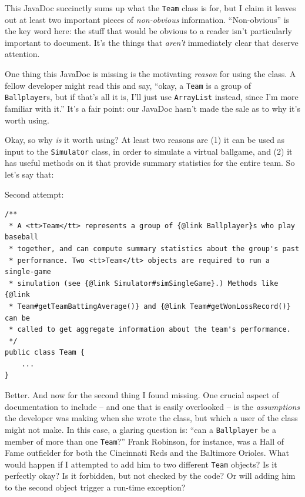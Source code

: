 This JavaDoc succinctly sums up what the \texttt{Team} class is for, but I
claim it leaves out at least two important pieces of \textit{non-obvious}
information. ``Non-obvious'' is the key word here: the stuff that would be
obvious to a reader isn't particularly important to document. It's the things
that \textit{aren't} immediately clear that deserve attention.

One thing this JavaDoc is missing is the motivating \textit{reason} for using
the class. A fellow developer might read this and say, ``okay, a \texttt{Team}
is a group of \texttt{Ballplayer}s, but if that's all it is, I'll just use
\texttt{ArrayList} instead, since I'm more familiar with it.'' It's a fair
point: our JavaDoc hasn't made the sale as to why it's worth using.

Okay, so why \textit{is} it worth using? At least two reasons are (1) it can
be used as input to the \texttt{Simulator} class, in order to simulate a
virtual ballgame, and (2) it has useful methods on it that provide summary
statistics for the entire team. So let's say that:

Second attempt:
\vspace{-.15in}
\begin{Verbatim}[fontsize=\footnotesize,samepage=true,frame=single]
/**
 * A <tt>Team</tt> represents a group of {@link Ballplayer}s who play baseball
 * together, and can compute summary statistics about the group's past
 * performance. Two <tt>Team</tt> objects are required to run a single-game
 * simulation (see {@link Simulator#simSingleGame}.) Methods like {@link 
 * Team#getTeamBattingAverage()} and {@link Team#getWonLossRecord()} can be 
 * called to get aggregate information about the team's performance.
 */
public class Team {
    ...
}
\end{Verbatim}

Better. And now for the second thing I found missing. One crucial aspect of
documentation to include -- and one that is easily overlooked -- is the
\textit{assumptions} the developer was making when she wrote the class, but
which a user of the class might not make. In this case, a glaring question is:
``can a \texttt{Ballplayer} be a member of more than one \texttt{Team}?'' Frank
Robinson, for instance, was a Hall of Fame outfielder for both the Cincinnati
Reds and the Baltimore Orioles. What would happen if I attempted to add him to
two different \texttt{Team} objects? Is it perfectly okay? Is it forbidden,
but not checked by the code? Or will adding him to the second object trigger a
run-time exception?

